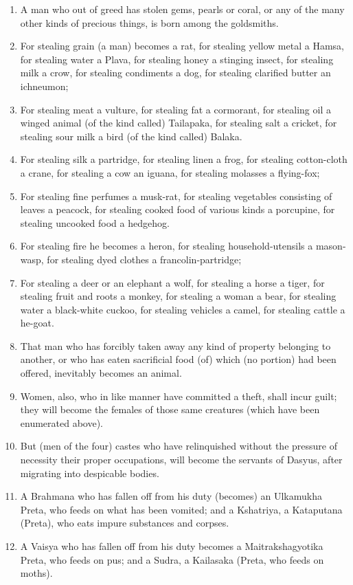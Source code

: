 \begin{enumerate}
\item A man who out of greed has stolen gems, pearls or coral, or any of the many other kinds of precious things, is born among the goldsmiths.
\item For stealing grain (a man) becomes a rat, for stealing yellow metal a Hamsa, for stealing water a Plava, for stealing honey a stinging insect, for stealing milk a crow, for stealing condiments a dog, for stealing clarified butter an ichneumon;
\item For stealing meat a vulture, for stealing fat a cormorant, for stealing oil a winged animal (of the kind called) Tailapaka, for stealing salt a cricket, for stealing sour milk a bird (of the kind called) Balaka.
\item For stealing silk a partridge, for stealing linen a frog, for stealing cotton-cloth a crane, for stealing a cow an iguana, for stealing molasses a flying-fox;
\item For stealing fine perfumes a musk-rat, for stealing vegetables consisting of leaves a peacock, for stealing cooked food of various kinds a porcupine, for stealing uncooked food a hedgehog.
\item For stealing fire he becomes a heron, for stealing household-utensils a mason-wasp, for stealing dyed clothes a francolin-partridge;
\item For stealing a deer or an elephant a wolf, for stealing a horse a tiger, for stealing fruit and roots a monkey, for stealing a woman a bear, for stealing water a black-white cuckoo, for stealing vehicles a camel, for stealing cattle a he-goat.
\item That man who has forcibly taken away any kind of property belonging to another, or who has eaten sacrificial food (of) which (no portion) had been offered, inevitably becomes an animal.
\item Women, also, who in like manner have committed a theft, shall incur guilt; they will become the females of those same creatures (which have been enumerated above).
\item But (men of the four) castes who have relinquished without the pressure of necessity their proper occupations, will become the servants of Dasyus, after migrating into despicable bodies.
\item A Brahmana who has fallen off from his duty (becomes) an Ulkamukha Preta, who feeds on what has been vomited; and a Kshatriya, a Kataputana (Preta), who eats impure substances and corpses.
\item A Vaisya who has fallen off from his duty becomes a Maitrakshagyotika Preta, who feeds on pus; and a Sudra, a Kailasaka (Preta, who feeds on moths).

\end{enumerate}

